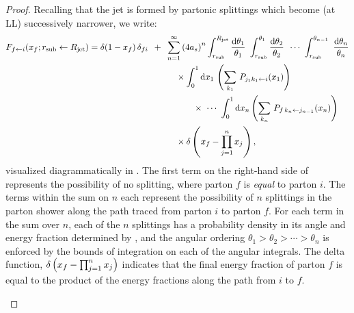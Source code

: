 \begin{proof}
Recalling that the jet is formed by partonic splittings which become (at LL) successively narrower, we write:
\begin{align}
    F_{f \leftarrow i}(x_f; \rsub \leftarrow \Rjet)
    &=
    \delta(1-x_f) \, \delta_{fi}
    \,\,\,
    +
    \,\,\,
    \sum_{n = 1}^\infty
    \le( 4 a_s \ri)^n
    \int^{\Rjet}_{\rsub} \frac{\dd\theta_1}{\theta_1}
    \,\,
    \int^{\theta_1}_{\rsub} \frac{\dd\theta_2}{\theta_2}
    \,\,\,
    \cdots
    \,\,
    \int^{\theta_{n-1}}_{\rsub}
    \,\,
    \frac{\dd\theta_n}{\theta_n}
    \notag
    \\
    &\qquad\qquad\qquad\qquad\qquad
    \label{eq:shower_fragmentation}
    \times
    \int_0^1 \dd x_1
    \,
    \le(\sum_{k_1}\,P_{j_1 k_1 \leftarrow i}(x_1)\ri)
    \\
    \notag
    &\qquad\qquad\qquad\qquad\qquad\qquad
    \times
    \,\,
    \cdots
    \,\,
    \int_0^1 \dd x_n
    \le(\sum_{k_n}\,P_{f\,k_n \leftarrow j_{n-1}}(x_n)\ri)
    \\
    \notag
    &\qquad\qquad\qquad\qquad\qquad
    \times
    \delta\le(x_f - \prod_{j=1}^n x_j\ri)
     ,
\end{align}
visualized diagrammatically in .
%
The first term on the right-hand side of  represents the possibility of no splitting, where parton \(f\) is \emph{equal} to parton \(i\).
%
The terms within the sum on \(n\) each represent the possibility of \(n\) splittings in the parton shower along the path traced from parton \(i\) to parton \(f\).
%
For each term in the sum over \(n\), each of the \(n\) splittings has a probability density in its angle and energy fraction determined by , and the angular ordering \(\theta_1 > \theta_2 > \cdots > \theta_n\) is enforced by the bounds of integration on each of the angular integrals.
%
The delta function, \(\delta\left(x_f - \prod_{j = 1}^n x_j\right)\) indicates that the final energy fraction of parton \(f\) is equal to the product of the energy fractions along the path from \(i\) to \(f\).


\begin{figure}[t!]
    \centering


\end{figure}
\end{proof}
